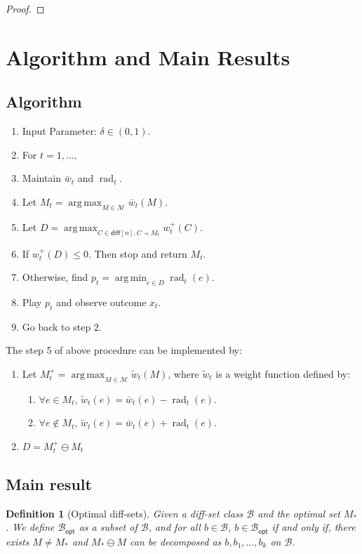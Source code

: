 \documentclass{article}
\newtheorem{define}{Definition}
\newcommand{\M}{\mathcal M}
\newcommand{\diff}{\mathsf{diff}}
\newcommand{\diffvalid}{\prec}
\newcommand{\B}{\mathcal B}
\newcommand{\Bopt}{\mathcal B_{\mathsf{opt}}}
\DeclareMathOperator{\rad}{rad}
\DeclareMathOperator{\argmax}{arg\,max}
\DeclareMathOperator{\argmin}{arg\,min}
\begin{document}
\begin{spacing}{1.1}
\begin{proof}
\end{proof}


\section{Algorithm and Main Results}

\subsection{Algorithm}
\begin{enumerate}
\item Input Parameter: $\delta \in (0,1)$.
\item For $t=1,\ldots, $
\item Maintain $\bar w_t$ and $\rad_t$.
\item Let $M_t = \argmax_{M\in \M} \bar w_t(M)$. 
\item Let $D=\argmax_{C \in \diff[n], C \diffvalid M_t} w_t^+(C)$. 
\item If $w_t^+(D) \le 0$. Then stop and return $M_t$.
\item Otherwise, find $p_t = \argmin_{e\in D} \rad_t(e)$.
\item Play $p_t$ and observe outcome $x_t$.
\item Go back to step 2.
\end{enumerate}

The step 5 of above procedure can be implemented by:
\begin{enumerate}
\item Let $M_t^+ = \argmax_{M\in \M} \tilde w_t(M)$, where $\tilde w_t$ is a weight function defined by:
	\begin{enumerate}
		\item $\forall e\in M_t$, $\tilde w_t(e) = \bar w_t(e)-\rad_t(e)$.
		\item $\forall e\not \in M_t$, $\tilde w_t(e) = \bar w_t(e)+\rad_t(e)$.
	\end{enumerate}
\item $D = M_t^+\ominus M_t$
\end{enumerate}

\subsection{Main result}

\begin{define}[Optimal diff-sets]
Given a diff-set class $\B$ and the optimal set $M_*$.
We define $\Bopt$ as a subset of $\B$, and for all $b\in \B$, $b\in \Bopt$ if and only if,
there exists $M\not=M_*$ and $M_* \ominus M$ can be decomposed as $b,b_1,\ldots,b_k$ on $\B$.
\end{define}


\end{spacing}
\end{document}
